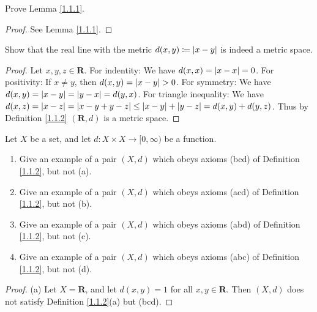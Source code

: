 \exercisesection

\begin{exercise}\label{ex 1.1.1}
    Prove Lemma \ref{1.1.1}.
\end{exercise}

\begin{proof}
    See Lemma \ref{1.1.1}.
\end{proof}

\begin{exercise}\label{ex 1.1.2}
    Show that the real line with the metric \(d(x, y) \coloneqq \abs*{x - y}\) is indeed a metric space.
\end{exercise}

\begin{proof}
    Let \(x, y, z \in \mathbf{R}\).
    For indentity:
    We have \(d(x, x) = \abs*{x - x} = 0\).
    For positivity:
    If \(x \neq y\), then \(d(x, y) = \abs*{x - y} > 0\).
    For symmetry:
    We have \(d(x, y) = \abs*{x - y} = \abs*{y - x} = d(y, x)\).
    For triangle inequality:
    We have \(d(x, z) = \abs*{x - z} = \abs*{x - y + y - z} \leq \abs*{x - y} + \abs*{y - z} = d(x, y) + d(y, z)\).
    Thus by Definition \ref{1.1.2} \((\mathbf{R}, d)\) is a metric space.
\end{proof}

\begin{exercise}\label{ex 1.1.3}
    Let \(X\) be a set, and let \(d : X \times X \to [0, \infty)\) be a function.
    \begin{enumerate}
        \item Give an example of a pair \((X, d)\) which obeys axioms (bcd) of Definition \ref{1.1.2}, but not (a).
        \item Give an example of a pair \((X, d)\) which obeys axioms (acd) of Definition \ref{1.1.2}, but not (b).
        \item Give an example of a pair \((X, d)\) which obeys axioms (abd) of Definition \ref{1.1.2}, but not (c).
        \item Give an example of a pair \((X, d)\) which obeys axioms (abc) of Definition \ref{1.1.2}, but not (d).
    \end{enumerate}
\end{exercise}

\begin{proof}{(a)}
    Let \(X = \mathbf{R}\), and let \(d(x, y) = 1\) for all \(x, y \in \mathbf{R}\).
    Then \((X, d)\) does not satisfy Definition \ref{1.1.2}(a) but (bcd).
\end{proof}


